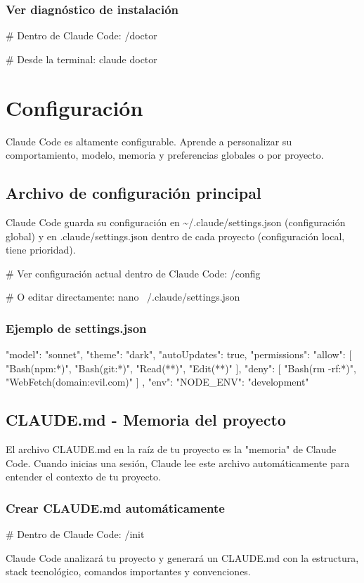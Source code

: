 \documentclass[11pt,a4paper]{book}
\begin{document}
\subsection{Ver diagnóstico de instalación}
\begin{codebox}
# Dentro de Claude Code:
/doctor

# Desde la terminal:
claude doctor
\end{codebox}
\chapter{Configuración}
Claude Code es altamente configurable. Aprende a personalizar su comportamiento, modelo, memoria y preferencias globales o por proyecto.

\section{Archivo de configuración principal}
Claude Code guarda su configuración en \textasciitilde{}/.claude/settings.json (configuración global) y en .claude/settings.json dentro de cada proyecto (configuración local, tiene prioridad).

\begin{codebox}
# Ver configuración actual dentro de Claude Code:
/config

# O editar directamente:
nano ~/.claude/settings.json
\end{codebox}
\subsection{Ejemplo de settings.json}
\begin{codebox}
{
  "model": "sonnet",
  "theme": "dark",
  "autoUpdates": true,
  "permissions": {
    "allow": [
      "Bash(npm:*)",
      "Bash(git:*)",
      "Read(**)",
      "Edit(**)"
    ],
    "deny": [
      "Bash(rm -rf:*)",
      "WebFetch(domain:evil.com)"
    ]
  },
  "env": {
    "NODE_ENV": "development"
  }
}
\end{codebox}
\section{CLAUDE.md - Memoria del proyecto}
El archivo CLAUDE.md en la raíz de tu proyecto es la "memoria" de Claude Code. Cuando inicias una sesión, Claude lee este archivo automáticamente para entender el contexto de tu proyecto.

\subsection{Crear CLAUDE.md automáticamente}
\begin{codebox}
# Dentro de Claude Code:
/init
\end{codebox}
Claude Code analizará tu proyecto y generará un CLAUDE.md con la estructura, stack tecnológico, comandos importantes y convenciones.
\end{document}

